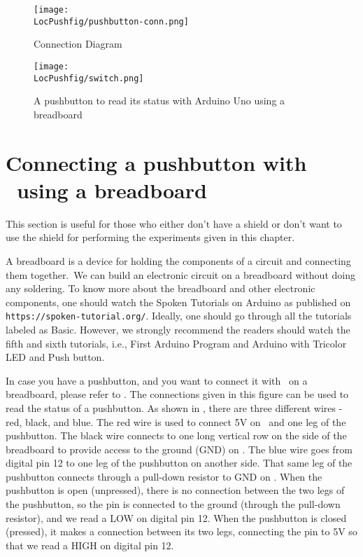 \begin{figure}
\centering
\texttt{[image: \\LocPushfig/pushbutton-conn.png]}
\caption{Connection Diagram}
\label{fig:pushbuttonconn}
\end{figure}


\begin{figure}
  \centering
  \texttt{[image: \\LocPushfig/switch.png]}
  \caption{A pushbutton to read its status with Arduino Uno using a breadboard}
  \label{fig:switch-bread}
\end{figure}

\section{Connecting a pushbutton with \arduino\ using a breadboard}
This section is useful for those who either don't have a shield or don't want to use the shield
for performing the experiments given in this chapter. 

A breadboard is a device for holding the components of a circuit and connecting 
them together. We can build an electronic circuit on a breadboard without doing any 
soldering. To know more about the breadboard and other electronic components, 
one should watch the Spoken Tutorials on Arduino as published on
{\tt https://spoken-tutorial.org/}. Ideally, one should go through all the
tutorials labeled as Basic. However, we strongly recommend the readers should
watch the fifth and sixth tutorials, i.e., First Arduino Program and 
Arduino with Tricolor LED and Push button.

In case you have a pushbutton, and you want to connect it with \arduino\ on a breadboard, 
please refer to . The connections given in this figure can be used to 
read the status of a pushbutton. As shown in , 
there are three different wires - red, black, and blue. The red wire is used to connect 5V on 
\arduino\ and one leg of the pushbutton. The black wire connects to one long vertical row on 
the side of the breadboard to provide access to the ground (GND) on \arduino. 
The blue wire goes from digital pin 12 to one leg of the pushbutton on another side. 
That same leg of the pushbutton connects through a pull-down resistor to GND on \arduino. 
When the pushbutton is open (unpressed), there is no connection between the two legs of the pushbutton, 
so the pin is connected to the ground (through the pull-down resistor), and we read a LOW on
digital pin 12. When the pushbutton is closed (pressed), it makes a connection between its two legs, 
connecting the pin to 5V so that we read a HIGH on digital pin 12. 

